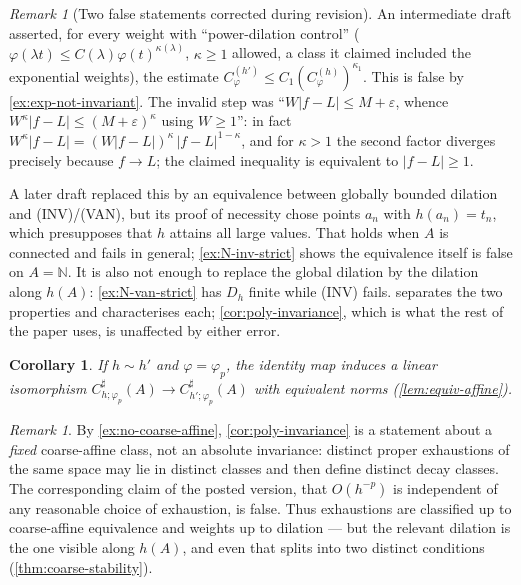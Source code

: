 \documentclass[11pt,a4paper]{article}
\numberwithin{equation}{section}
\theoremstyle{plain}
\newtheorem{corollary}[theorem]{Corollary}
\theoremstyle{definition}
\theoremstyle{remark}
\newtheorem{remark}[theorem]{Remark}
\newcommand{\N}{\mathbb{N}}
\begin{document}
\begin{remark}[Two false statements corrected during revision]\label{rem:invariance-history}
An intermediate draft asserted, for every weight with ``power-dilation control''
($\varphi(\lambda t)\le C(\lambda)\varphi(t)^{\kappa(\lambda)}$, $\kappa\ge1$ allowed, a
class it claimed included the exponential weights), the estimate
$C^{(h')}_\varphi\le C_1(C^{(h)}_\varphi)^{\kappa_1}$. This is false by
\cref{ex:exp-not-invariant}. The invalid step was
``$W|f-L|\le M+\varepsilon$, whence $W^{\kappa}|f-L|\le(M+\varepsilon)^{\kappa}$ using
$W\ge1$'': in fact
$W^{\kappa}|f-L|=(W|f-L|)^{\kappa}\,|f-L|^{1-\kappa}$, and for $\kappa>1$ the second factor
diverges precisely because $f\to L$; the claimed inequality is equivalent to $|f-L|\ge1$.

A later draft replaced this by an equivalence between globally bounded dilation and
(INV)/(VAN), but its proof of necessity chose points $a_n$ with $h(a_n)=t_n$, which
presupposes that $h$ attains all large values. That holds when $A$ is connected and fails
in general; \cref{ex:N-inv-strict} shows the equivalence itself is false on $A=\N$. It is
also not enough to replace the global dilation by the dilation along $h(A)$:
\cref{ex:N-van-strict} has $D_h$ finite while (INV) fails. 
separates the two properties and characterises each; \cref{cor:poly-invariance}, which is
what the rest of the paper uses, is unaffected by either error.
\end{remark}

\begin{corollary}\label{cor:coarse-iso}
If $h\sim h'$ and $\varphi=\varphi_p$, the identity map induces a linear isomorphism
$C^{\sharp}_{h;\varphi_p}(A)\to C^{\sharp}_{h';\varphi_p}(A)$ with equivalent norms
(\cref{lem:equiv-affine}).
\end{corollary}

\begin{remark}
By \cref{ex:no-coarse-affine}, \cref{cor:poly-invariance} is a statement about a
\emph{fixed} coarse-affine class, not an absolute invariance: distinct proper exhaustions
of the same space may lie in distinct classes and then define distinct decay classes. The
corresponding claim of the posted version, that $O(h^{-p})$ is independent of any reasonable
choice of exhaustion, is false. Thus exhaustions are classified up to coarse-affine
equivalence and weights up to dilation ---  but the relevant dilation is the one visible
along $h(A)$, and even that splits into two distinct conditions
(\cref{thm:coarse-stability}).
\end{remark}
\end{document}
